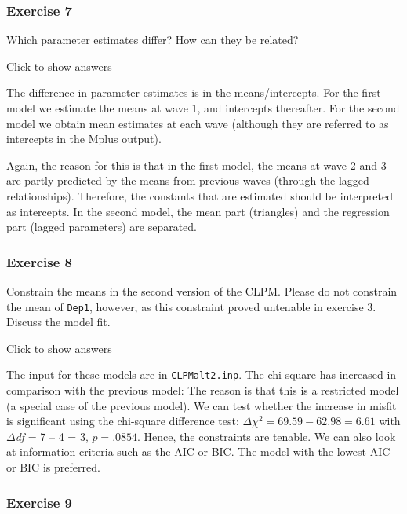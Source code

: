 \documentclass[
]{book}
\begin{document}
\hypertarget{exercise-7}{%
\subsubsection*{Exercise 7}\label{exercise-7}}

Which parameter estimates differ? How can they be related?

Click to show answers

The difference in parameter estimates is in the means/intercepts. For the first model we estimate the means at wave 1, and intercepts thereafter. For the second model we obtain mean estimates at each wave (although they are referred to as intercepts in the Mplus output).

Again, the reason for this is that in the first model, the means at wave 2 and 3 are partly predicted by the means from previous waves (through the lagged relationships). Therefore, the constants that are estimated should be interpreted as intercepts. In the second model, the mean part (triangles) and the regression part (lagged parameters) are separated.

\hypertarget{exercise-8}{%
\subsubsection*{Exercise 8}\label{exercise-8}}

Constrain the means in the second version of the CLPM. Please do not constrain the mean of \texttt{Dep1}, however, as this constraint proved untenable in exercise 3. Discuss the model fit.

Click to show answers

The input for these models are in \texttt{CLPMalt2.inp}. The chi-square has increased in comparison with the previous model: The reason is that this is a restricted model (a special case of the previous model). We can test whether the increase in misfit is significant using the chi-square difference test: \(\Delta\chi^{2} = 69.59 - 62.98 = 6.61\) with \(\Delta\)\emph{df} = 7 -- 4 = 3, \(p = .0854\). Hence, the constraints are tenable. We can also look at information criteria such as the AIC or BIC. The model with the lowest AIC or BIC is preferred.

\hypertarget{exercise-9}{%
\subsubsection*{Exercise 9}\label{exercise-9}}
\end{document}
